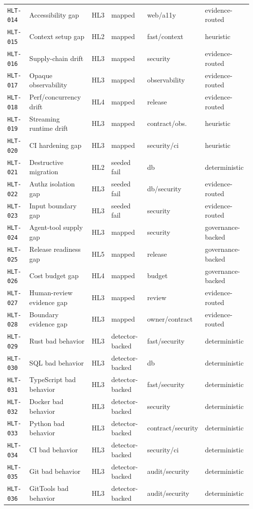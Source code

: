 \begin{table}[t]
\begin{tabularx}{\textwidth}{L{0.17\textwidth} L{0.20\textwidth} L{0.10\textwidth} L{0.14\textwidth} L{0.15\textwidth} Y}
\texttt{HLT-014} & Accessibility gap & HL3 & mapped & web/a11y & evidence-routed \\
\texttt{HLT-015} & Context setup gap & HL2 & mapped & fast/context & heuristic \\
\texttt{HLT-016} & Supply-chain drift & HL3 & mapped & security & evidence-routed \\
\texttt{HLT-017} & Opaque observability & HL3 & mapped & observability & evidence-routed \\
\texttt{HLT-018} & Perf/concurrency drift & HL4 & mapped & release & evidence-routed \\
\texttt{HLT-019} & Streaming runtime drift & HL3 & mapped & contract/obs. & heuristic \\
\texttt{HLT-020} & CI hardening gap & HL3 & mapped & security/ci & heuristic \\
\texttt{HLT-021} & Destructive migration & HL2 & seeded fail & db & deterministic \\
\texttt{HLT-022} & Authz isolation gap & HL3 & seeded fail & db/security & evidence-routed \\
\texttt{HLT-023} & Input boundary gap & HL3 & seeded fail & security & evidence-routed \\
\texttt{HLT-024} & Agent-tool supply gap & HL3 & mapped & security & governance-backed \\
\texttt{HLT-025} & Release readiness gap & HL5 & mapped & release & governance-backed \\
\texttt{HLT-026} & Cost budget gap & HL4 & mapped & budget & governance-backed \\
\texttt{HLT-027} & Human-review evidence gap & HL3 & mapped & review & evidence-routed \\
\texttt{HLT-028} & Boundary evidence gap & HL3 & mapped & owner/contract & evidence-routed \\
\texttt{HLT-029} & Rust bad behavior & HL3 & detector-backed & fast/security & deterministic \\
\texttt{HLT-030} & SQL bad behavior & HL3 & detector-backed & db & deterministic \\
\texttt{HLT-031} & TypeScript bad behavior & HL3 & detector-backed & fast/security & deterministic \\
\texttt{HLT-032} & Docker bad behavior & HL3 & detector-backed & security & deterministic \\
\texttt{HLT-033} & Python bad behavior & HL3 & detector-backed & contract/security & deterministic \\
\texttt{HLT-034} & CI bad behavior & HL3 & detector-backed & security/ci & deterministic \\
\texttt{HLT-035} & Git bad behavior & HL3 & detector-backed & audit/security & deterministic \\
\texttt{HLT-036} & GitTools bad behavior & HL3 & detector-backed & audit/security & deterministic \\
\bottomrule
\end{tabularx}
\end{table}

